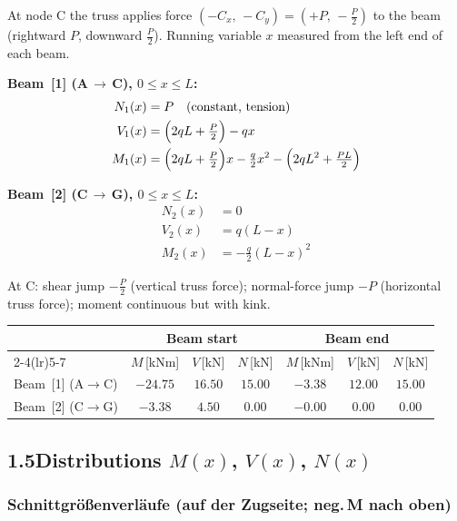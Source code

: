 \documentclass[a4paper,11pt]{article}
\begin{document}
At node C the truss applies force $(-C_x,\,-C_y) = (+P,\,-\tfrac{P}{2})$
to the beam (rightward $P$, downward $\tfrac{P}{2}$).
Running variable $x$ measured from the left end of each beam.

\textbf{Beam~[1] (A\,$\to$\,C), $0 \le x \le L$:}
\begin{align*}
  N_1(x) &= P \quad\text{(constant, tension)} \\
  V_1(x) &= \Bigl(2qL + \tfrac{P}{2}\Bigr) - qx \\
  M_1(x) &= \Bigl(2qL + \tfrac{P}{2}\Bigr)x - \tfrac{q}{2}x^2
            - \Bigl(2qL^2 + \tfrac{PL}{2}\Bigr)
\end{align*}

\textbf{Beam~[2] (C\,$\to$\,G), $0 \le x \le L$:}
\begin{align*}
  N_2(x) &= 0 \\
  V_2(x) &= q(L - x) \\
  M_2(x) &= -\tfrac{q}{2}(L - x)^2
\end{align*}

At C: shear jump $-\tfrac{P}{2}$ (vertical truss force);
normal-force jump $-P$ (horizontal truss force); moment continuous but with kink.

\medskip
\begin{center}
\begin{tabular}{l cccccc}
\toprule
 & \multicolumn{3}{c}{\textbf{Beam start}} & \multicolumn{3}{c}{\textbf{Beam end}} \\
\cmidrule(lr){2-4}\cmidrule(lr){5-7}
 & $M$\,[kNm] & $V$\,[kN] & $N$\,[kN]
 & $M$\,[kNm] & $V$\,[kN] & $N$\,[kN] \\
\midrule
Beam~[1] (A$\to$C) & $-24.75$ & $16.50$ & $15.00$ & $-3.38$ & $12.00$ & $15.00$ \\[3pt]
Beam~[2] (C$\to$G) & $-3.38$ & $4.50$ & $0.00$ & $-0.00$ & $0.00$ & $0.00$ \\
\bottomrule
\end{tabular}
\end{center}

\subsection*{1.5\quad Distributions $M(x)$, $V(x)$, $N(x)$}


\subsubsection*{Schnittgrößenverläufe (auf der Zugseite; neg.\,M nach oben)}
\end{document}
